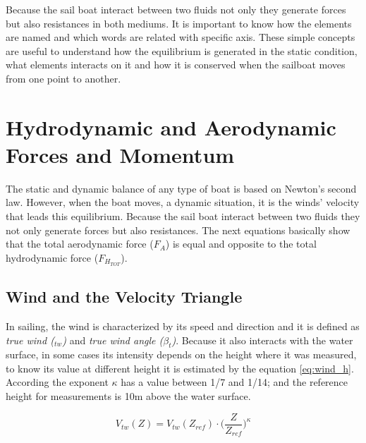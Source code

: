 Because the sail boat interact between two fluids not only they generate forces but also resistances in both mediums. It is important to know how the elements are named and which words are related with specific axis.  These simple concepts are useful to understand how the equilibrium is generated in the static condition, what elements interacts on it and how it is conserved when the sailboat moves from one point to another. \par 

\section{Hydrodynamic and Aerodynamic Forces and Momentum} \label{section:forces_moment}
The static and dynamic balance of any type of boat is based on Newton's second law. However, when the boat moves, a dynamic situation, it is the winds' velocity that leads this equilibrium. Because the sail boat interact between two fluids they not only  generate forces but also resistances.
The next equations basically show that the total aerodynamic force ($F_{A}$) is equal and opposite to the total hydrodynamic force ($F_{H_{TOT}}$). \par

\subsection{Wind and the Velocity Triangle}
In sailing, the wind is characterized by its speed and direction and it is defined as \textit{true wind ($_{tw}$)} and \textit{true wind angle ($\beta_{t}$)}.  Because it also interacts with the water surface, in some cases its intensity depends on the height where it was measured, to know its value at different height it is estimated by the equation \ref{eq:wind_h}. According \cite{claughton1998sailing} the exponent $\kappa$ has a value between 1/7 and 1/14; and the reference height for measurements is 10m above the water surface. \par 
\begin{equation} \label{eq:wind_h}
    V_{tw}(Z)=V_{tw}(Z_{ref}) \cdot \bigg( \frac{Z}{Z_{ref}} \bigg)^\kappa
\end{equation}

